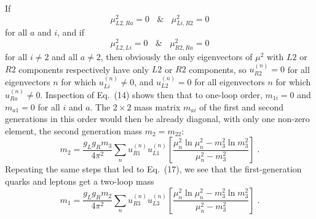 \documentclass[12pt]{article}
\begin{document}
If 
\begin{equation}
\mu^2_{L2,Ra}=0 ~~~~\&~~~~\mu^2_{Li,R2}=0
\end{equation}
for all $a$ and $i$, and if
\begin{equation}
\mu^2_{L2,Li}=0 ~~~~\&~~~~\mu^2_{R2,Ra}=0
\end{equation}
for all $i\neq 2$ and all $a\neq 2$, then obviously the only eigenvectors of $\mu^2$ with $L2$ or $R2$ components respectively have only $L2$ or $R2$ components, so 
 $u^{(n)}_{R2}=0$ for all eigenvectors $n$ for which 
$u^{(n)}_{Li}\neq 0$, and  $u^{(n)}_{L2}=0$  for all eigenvectors $n$ for which $u^{(n)}_{Ra}\neq 0$.  Inspection of Eq.~(14) shows then that to one-loop order, 
$m_{1i}=0$ and $m_{a1}=0$ for all $i$ and $a$.  The $2\times 2$ mass matrix $m_{ai}$ of the first and second generations in this order would then be already diagonal, with only one non-zero element, the  second generation mass $m_2=m_{22}$:
\begin{equation}
m_2=\frac{g_Lg_R m_3}{4\pi^2}\sum_{n}  u_{R1}^{(n)}u_{L1}^{(n)}\left[\frac{\mu_n^2\ln \mu_n^2-m_3^2\ln m_3^2}{\mu_n^2-m_3^2}
\right]\;.
\end{equation}
Repeating the same steps that led to Eq.~(17),  we see that the  first-generation quarks and leptons  get a two-loop mass
\begin{equation}
m_1=\frac{g_Lg_R m_2}{4\pi^2}\sum_{n}  u_{R3}^{(n)}u_{L3}^{(n)}\left[\frac{\mu_n^2\ln \mu_n^2-m_3^2\ln m_3^2}{\mu_n^2-m_3^2}\right]\;.
\end{equation}
\end{document}
